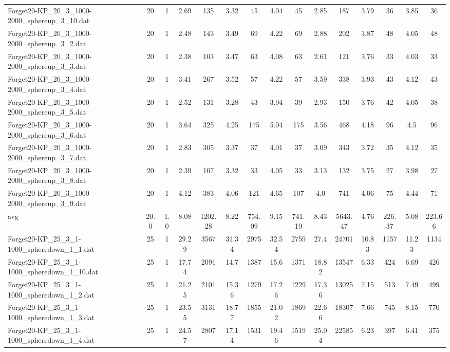 \begin{table}[!ht]
{\begin{tabular}{lcccccccccccccc}
Forget20-KP\_20\_3\_1000-2000\_sphereup\_3\_10.dat & 20 & 1 & 2.69 & 135 & 3.32 & 45 & 4.04 & 45 & 2.85 & 187 & 3.79 & 36 & 3.85 & 36 \\
Forget20-KP\_20\_3\_1000-2000\_sphereup\_3\_2.dat & 20 & 1 & 2.48 & 143 & 3.49 & 69 & 4.22 & 69 & 2.88 & 202 & 3.87 & 48 & 4.05 & 48 \\
Forget20-KP\_20\_3\_1000-2000\_sphereup\_3\_3.dat & 20 & 1 & 2.38 & 103 & 3.47 & 63 & 4.08 & 63 & 2.61 & 121 & 3.76 & 33 & 4.03 & 33 \\
Forget20-KP\_20\_3\_1000-2000\_sphereup\_3\_4.dat & 20 & 1 & 3.41 & 267 & 3.52 & 57 & 4.22 & 57 & 3.59 & 338 & 3.93 & 43 & 4.12 & 43 \\
Forget20-KP\_20\_3\_1000-2000\_sphereup\_3\_5.dat & 20 & 1 & 2.52 & 131 & 3.28 & 43 & 3.94 & 39 & 2.93 & 150 & 3.76 & 42 & 4.05 & 38 \\
Forget20-KP\_20\_3\_1000-2000\_sphereup\_3\_6.dat & 20 & 1 & 3.64 & 325 & 4.25 & 175 & 5.04 & 175 & 3.56 & 468 & 4.18 & 96 & 4.5 & 96 \\
Forget20-KP\_20\_3\_1000-2000\_sphereup\_3\_7.dat & 20 & 1 & 2.83 & 305 & 3.37 & 37 & 4.01 & 37 & 3.09 & 343 & 3.72 & 35 & 4.12 & 35 \\
Forget20-KP\_20\_3\_1000-2000\_sphereup\_3\_8.dat & 20 & 1 & 2.39 & 107 & 3.32 & 33 & 4.05 & 33 & 3.13 & 132 & 3.75 & 27 & 3.98 & 27 \\
Forget20-KP\_20\_3\_1000-2000\_sphereup\_3\_9.dat & 20 & 1 & 4.12 & 383 & 4.06 & 121 & 4.65 & 107 & 4.0 & 741 & 4.06 & 75 & 4.44 & 71 \\
\hline avg & 20.0 & 1.0 & 8.08& 1202.28 & 8.22& 754.09 & 9.15& 741.19 & 8.43& 5643.47 & 4.76& 226.37 & 5.08& 223.66\\ \hline
Forget20-KP\_25\_3\_1-1000\_spheredown\_1\_1.dat & 25 & 1 & 29.29 & 3567 & 31.34 & 2975 & 32.54 & 2759 & 27.4 & 24701 & 10.83 & 1157 & 11.23 & 1134 \\
Forget20-KP\_25\_3\_1-1000\_spheredown\_1\_10.dat & 25 & 1 & 17.74 & 2091 & 14.7 & 1387 & 15.6 & 1371 & 18.82 & 13547 & 6.33 & 424 & 6.69 & 426 \\
Forget20-KP\_25\_3\_1-1000\_spheredown\_1\_2.dat & 25 & 1 & 21.25 & 2101 & 15.36 & 1279 & 17.26 & 1229 & 17.36 & 13025 & 7.15 & 513 & 7.49 & 499 \\
Forget20-KP\_25\_3\_1-1000\_spheredown\_1\_3.dat & 25 & 1 & 23.55 & 3131 & 18.77 & 1855 & 21.02 & 1869 & 22.66 & 18307 & 7.66 & 745 & 8.15 & 770 \\
Forget20-KP\_25\_3\_1-1000\_spheredown\_1\_4.dat & 25 & 1 & 24.57 & 2807 & 17.14 & 1531 & 19.46 & 1519 & 25.04 & 22585 & 6.23 & 397 & 6.41 & 375 \\

\end{tabular}}
\end{table}
